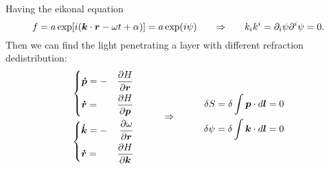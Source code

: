 Having the eikonal equation 
\begin{equation*}
	f = a \exp [i (\mbox{\boldmath $k$} \cdot\mbox{\boldmath $r$} - \omega t + \alpha)] = a \exp (i \psi)
	\hspace{0.6 cm}
	\Rightarrow
	\hspace{0.6 cm}
	k_i k^i = \partial_i \psi \partial^i \psi = 0.
\end{equation*}
Then we can find the light penetrating a layer with different refraction dedistribution:
\begin{equation*}
	\begin{aligned}
		\left\{
		\begin{aligned}
			&\mbox{\boldmath $\dot{p}$} = -&\frac{\partial H}{\partial \mbox{\boldmath $r$}}\\
			&\mbox{\boldmath $\dot{r}$} = &\frac{\partial H}{\partial \mbox{\boldmath $p$}}
		\end{aligned}\right.	\\
		\left\{
		\begin{aligned}
			&\mbox{\boldmath $\dot{k}$} = -&\frac{\partial \omega}{\partial \mbox{\boldmath $r$}}\\
			&\mbox{\boldmath $\dot{r}$} = &\frac{\partial H}{\partial \mbox{\boldmath $k$}}
		\end{aligned}\right.
	\end{aligned}
	\hspace{1 cm}
	\Rightarrow
	\hspace{1 cm}
	\begin{aligned}
		\delta S = \delta \int \mbox{\boldmath $p$} \cdot d \mbox{\boldmath $l$} = 0\\
		\delta \psi = \delta \int \mbox{\boldmath $k$} \cdot d \mbox{\boldmath $l$} = 0
	\end{aligned}
\end{equation*}